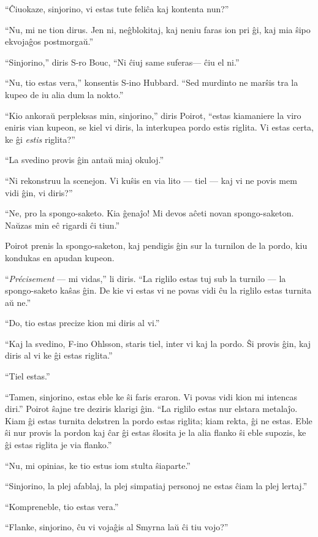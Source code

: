 ``Ĉiuokaze, sinjorino, vi estas tute feliĉa kaj kontenta nun?''

``Nu, mi ne tion dirus. Jen ni, neĝblokitaj, kaj neniu faras ion pri ĝi, kaj mia ŝipo ekvojaĝos postmorgaŭ.''

``Sinjorino,'' diris S-ro Bouc, ``Ni ĉiuj same suferas--- ĉiu el ni.''

``Nu, tio estas vera,'' konsentis S-ino Hubbard. ``Sed murdinto ne marŝis tra la kupeo de iu alia dum la nokto.''

``Kio ankoraŭ perpleksas min, sinjorino,'' diris Poirot, ``estas kiamaniere la viro eniris vian kupeon, se kiel vi diris, la interkupea pordo estis riglita. Vi estas certa, ke ĝi \emph{estis} riglita?''

``La svedino provis ĝin antaŭ miaj okuloj.''

``Ni rekonstruu la scenejon. Vi kuŝis en via lito --- tiel --- kaj vi ne povis mem vidi ĝin, vi diris?''

``Ne, pro la spongo-saketo. Kia ĝenaĵo! Mi devos aĉeti novan spongo-saketon. Naŭzas min eĉ rigardi ĉi tiun.''

Poirot prenis la spongo-saketon, kaj pendigis ĝin sur la turnilon de la pordo, kiu kondukas en apudan kupeon.

``\emph{Précisement} --- mi vidas,'' li diris. ``La riglilo estas tuj sub la turnilo --- la spongo-saketo kaŝas ĝin. De kie vi estas vi ne povas vidi ĉu la riglilo estas turnita aŭ ne.''

``Do, tio estas precize kion mi diris al vi.''

``Kaj la svedino, F-ino Ohlsson, staris tiel, inter vi kaj la pordo. Ŝi provis ĝin, kaj diris al vi ke ĝi estas riglita.''

``Tiel estas.''

``Tamen, sinjorino, estas eble ke ŝi faris eraron. Vi povas vidi kion mi intencas diri.'' Poirot ŝajne tre deziris klarigi ĝin. ``La riglilo estas nur elstara metalaĵo. Kiam ĝi estas turnita dekstren la pordo estas riglita; kiam rekta, ĝi ne estas. Eble ŝi nur provis la pordon kaj ĉar ĝi estas ŝlosita je la alia flanko ŝi eble supozis, ke ĝi estas riglita je via flanko.''

``Nu, mi opinias, ke tio estus iom stulta ŝiaparte.''

``Sinjorino, la plej afablaj, la plej simpatiaj personoj ne estas ĉiam la plej lertaj.''

``Kompreneble, tio estas vera.''

``Flanke, sinjorino, ĉu vi vojaĝis al Smyrna laŭ ĉi tiu vojo?''


